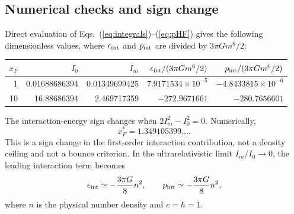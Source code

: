 \documentclass[11pt]{article}
\begin{document}
\subsection{Numerical checks and sign change}
Direct evaluation of Eqs.~(\ref{eq:integrals})--(\ref{eq:pHF}) gives the following dimensionless values, where $\epsilon_{\rm int}$ and $p_{\rm int}$ are divided by $3\pi Gm^6/2$:
\begin{center}
\begin{tabular}{rrrrr}
\toprule
$x_F$ & $I_0$ & $I_m$ & $\epsilon_{\rm int}/(3\pi Gm^6/2)$ & $p_{\rm int}/(3\pi Gm^6/2)$\\
\midrule
1 & 0.01688686394 & 0.01349699425 & $7.9171534\times10^{-5}$ & $-4.8433815\times10^{-6}$\\
10 & 16.88686394 & 2.469717359 & $-272.9671661$ & $-280.7656601$\\
\bottomrule
\end{tabular}
\end{center}
The interaction-energy sign changes when $2I_m^2-I_0^2=0$. Numerically,
\begin{equation}
\boxed{x_F^*=1.349105399\ldots.}
\label{eq:root}
\end{equation}
This is a sign change in the first-order interaction contribution, not a density ceiling and not a bounce criterion. In the ultrarelativistic limit $I_m/I_0\to0$, the leading interaction term becomes
\begin{equation}
\epsilon_{\rm int}\simeq-\frac{3\pi G}{8}n^2,
\qquad
p_{\rm int}\simeq-\frac{3\pi G}{8}n^2,
\label{eq:URinteraction}
\end{equation}
where $n$ is the physical number density and $c=\hbar=1$.
\end{document}
